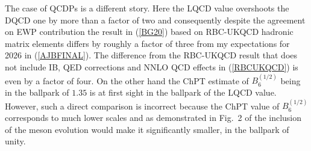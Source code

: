 \documentclass[12pt,a4paper]{article}
\newcommand{\bsi}{B_6^{(1/2)}}
\begin{document}
The case of QCDPs is a different story. Here the LQCD value  overshoots the DQCD
one by more than a factor of two 
and consequently despite the agreement on EWP contribution the result in (\ref{BG20})
based on RBC-UKQCD hadronic matrix elements differs by roughly a factor of three
from my expectations for 2026 in (\ref{AJBFINAL}). The difference from the
RBC-UKQCD result that does not include IB, QED corrections and NNLO QCD effects in (\ref{RBCUKQCD}) is even by a factor of four. On the other hand
the ChPT estimate of $\bsi$ being in the ballpark of $1.35$ is  at first sight
in the ballpark of the LQCD value. However, such a direct comparison is incorrect because the ChPT value of $\bsi$ corresponds to much lower scales and as demonstrated
in Fig.~2 of \cite{Buras:2018ozh} the inclusion of the meson evolution would
make it significantly smaller, in the ballpark of unity.
\end{document}
